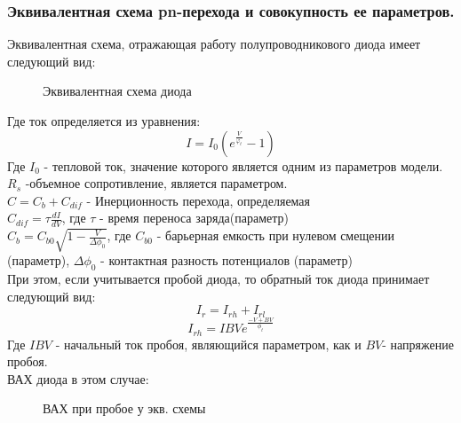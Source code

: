 \subsubsection{Эквивалентная схема pn-перехода и совокупность ее параметров.}
Эквивалентная схема, отражающая работу полупроводникового диода имеет следующий вид:


\begin{center}
	\begin{figure}[h!]
		\caption{Эквивалентная схема диода}	
		\label{pic:pn-eqiv}
	\end{figure}
\end{center}

Где ток определяется из уравнения:
\begin{equation}
I = I_0 \left( e^{\frac{V}{\varphi_t}}-1 \right)
\end{equation}
Где $I_0$ - тепловой ток, значение которого является одним из параметров модели.\\
$R_s$ -объемное сопротивление, является параметром.\\
$C = C_b+ C_{dif}$ - Инерционность перехода, определяемая \\
$C_{dif} = \tau \frac{d I}{d V}$, где $\tau$ - время переноса заряда(параметр)\\
$C_b = C_{b0} \sqrt{1 - \frac{V}{\Delta \phi_0}}$, где $C_{b0}$ - барьерная емкость при нулевом смещении (параметр),
$\Delta \phi_0$ - контактная разность потенциалов (параметр)\\
\label{1_2_5}
При этом, если учитывается пробой диода, то обратный ток диода принимает следующий вид:
\begin{equation}
I_r = I_{rh} + I_{rl}
\end{equation}
\begin{equation}
I_{rh} = IBV e^{\frac{- V + BV}{\phi_t}}
\end{equation}
Где $IBV$ - начальный ток пробоя, являющийся параметром, как и $BV$- напряжение пробоя. \\

ВАХ диода в этом случае:


\begin{center}
	\begin{figure}[h!]
		\caption{ВАХ при пробое у экв. схемы}	
		\label{pic:pn-rev_VAH}
	\end{figure}
\end{center}

\pagebreak
